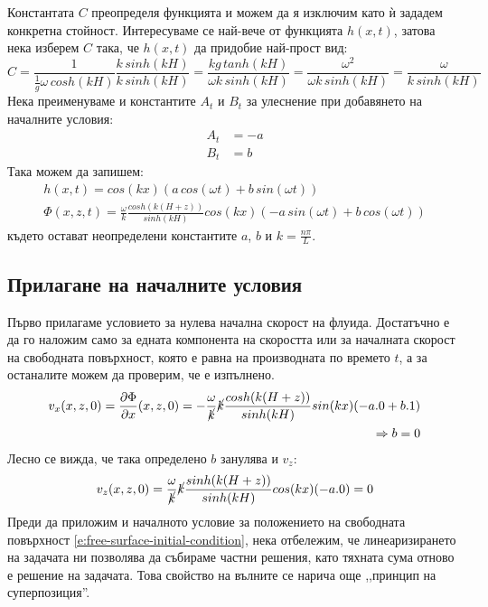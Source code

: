 \documentclass[12pt]{article}
\numberwithin{equation}{section}
\begin{document}
Константата $C$ преопределя функцията и можем да я изключим като ѝ зададем конкретна стойност. Интересуваме се най-вече от функцията $h(x,t)$, затова нека изберем $C$ така, че $h(x,t)$ да придобие най-прост вид:
\begin{equation}
    C = \frac{1}{\frac{1}{g}\omega \, cosh(kH)} \frac{k \, sinh(kH)}{k \, sinh(kH)}
    = \frac{kg \, tanh(kH)}{\omega k \, sinh(kH)}
    = \frac{\omega^2}{\omega k \, sinh(kH)}
    = \frac{\omega}{k \, sinh(kH)}
\end{equation}
Нека преименуваме и константите $A_t$ и $B_t$ за улеснение при добавянето на началните условия:
\begin{equation}
    \begin{aligned}
        A_t &= -a \\
        B_t &= b
    \end{aligned}
\end{equation}
Така можем да запишем:
\begin{equation}
    \label{e:linearized-solution}
    \begin{gathered}
        h(x,t) = cos(kx)(a \, cos(\omega t) + b \, sin(\omega t)) \\
        \Phi(x,z,t) = \frac{\omega}{k}\frac{cosh(k(H+z))}{sinh(kH)}cos(kx)(-a \, sin(\omega t) + b \, cos(\omega t))
    \end{gathered}
\end{equation}
където остават неопределени константите $a$, $b$ и $k=\frac{n \pi}{L}$.

\subsection{Прилагане на началните условия}
Първо прилагаме условието за нулева начална скорост на флуида. Достатъчно е да го наложим само за едната компонента на скоростта или за началната скорост на свободната повърхност, която е равна на производната по времето $t$, а за останалите можем да проверим, че е изпълнено.
\begin{equation}
    \begin{split}
        v_x(x,z,0) = \frac{\partial \Phi}{\partial x}(x,z,0)
        = -\frac{\omega}{\cancel{k}}\cancel{k}\frac{cosh(k(H+z))}{sinh(kH)}sin(kx)(-a.0+b.1) \\
        \Rightarrow
        b = 0
    \end{split}
\end{equation}
Лесно се вижда, че така определено $b$ занулява и $v_z$:
\begin{equation}
    v_z(x,z,0) = \frac{\omega}{\cancel{k}}\cancel{k}\frac{sinh(k(H+z))}{sinh(kH)}cos(kx)(-a.0) = 0
\end{equation}
Преди да приложим и началното условие за положението на свободната повърхност \autoref{e:free-surface-initial-condition}, нека отбележим, че линеаризирането на задачата ни позволява да събираме частни решения, като тяхната сума отново е решение на задачата. Това свойство на вълните се нарича още ,,принцип на суперпозиция''.
\end{document}
